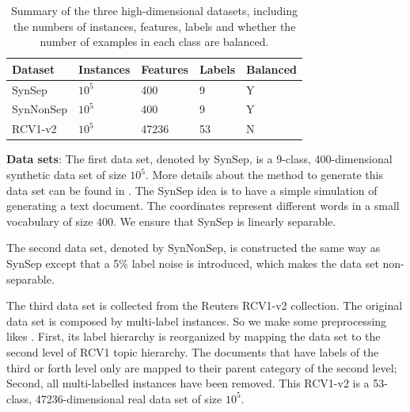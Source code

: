 \documentclass[preprint,12pt,authoryear]{elsarticle}
\begin{document}
\begin{table}[h]
	\caption{Summary of the three high-dimensional datasets, including the numbers of instances, features, labels and whether the number of examples in each class are balanced.}
	\label{table:mce}
	\begin{center}
		\begin{tabular}{l l l l l}
			{\bf Dataset}  & {\bf Instances} & {\bf Features} & {\bf Labels}& {\bf Balanced}\\
			\hline
			SynSep & $10^5$ 	& 400 	& 9 & Y\\
			
			SynNonSep & $10^5$ & 400 	& 9 & Y\\
			
			RCV1-v2  & $10^5$ 	& 47236 	& 53 & N\\
			
			
		\end{tabular}
	\end{center}
\end{table}

\textbf{Data sets}:
The first data set, denoted by SynSep,  is a 9-class, 400-dimensional synthetic data set of size $10^5$. More details about the method to generate this data set can be found in \cite{kakade2008efficient}. The SynSep  idea is to have a simple simulation of generating a text document. The coordinates represent different words in a small vocabulary of size $400$. We ensure that SynSep is linearly separable. 

The second data set, denoted by SynNonSep, is constructed  the same way as  SynSep except that a 5\% label noise is introduced, which makes the data set non-separable. 

The third data set is collected from the Reuters RCV1-v2 collection\cite{David04RCV}. The original data set is composed by multi-label instances. So we make some preprocessing likes \cite{RB08a}. First, its label hierarchy is reorganized by mapping the data set to the second level of RCV1 topic hierarchy. The documents that have labels of the third or forth level only are mapped to their parent category of the second level; Second, all multi-labelled instances have been removed. This RCV1-v2 is a 53-class,  47236-dimensional real data set of size $10^5$. 
\end{document}
